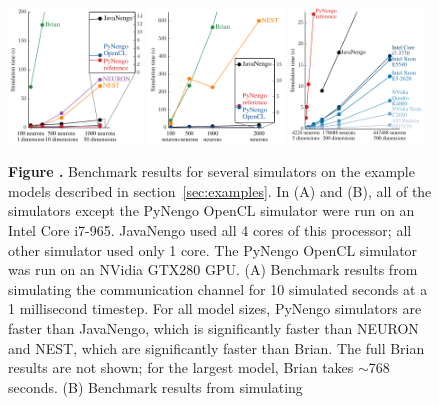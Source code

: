 \documentclass{frontiersSCNS}
\begin{document}
\begin{figure}
\begin{center}
  \includegraphics[width=0.32\textwidth]{bench_cchannel}
  \includegraphics[width=0.32\textwidth]{bench_lorenz}
  \includegraphics[width=0.32\textwidth]{bench_cconv}
\end{center}
 \textbf{
     \label{fig:benchmarks}
     Figure .}{
     Benchmark results for several simulators
     on the example models described
     in section~\ref{sec:examples}.
     In (A) and (B), all of the simulators
     except the PyNengo OpenCL simulator
     were run on an Intel Core i7-965.
     JavaNengo used all 4 cores of this processor;
     all other simulator used only 1 core.
     The PyNengo OpenCL simulator
     was run on an NVidia GTX280 GPU.
     (A) Benchmark results from simulating
     the communication channel for 10 simulated seconds
     at a 1 millisecond timestep.
     For all model sizes, PyNengo simulators
     are faster than JavaNengo,
     which is significantly faster than NEURON and NEST,
     which are significantly faster than Brian.
     The full Brian results are not shown;
     for the largest model, Brian takes $\sim$768 seconds.
     (B) Benchmark results from simulating
}
\end{figure}
\end{document}
